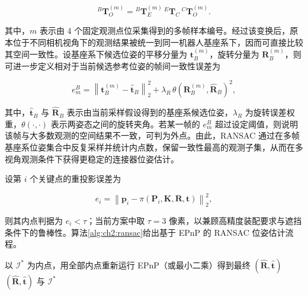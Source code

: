 $$
{}^{B}\mathbf{T}_{O}^{(m)} = {}^{B}\mathbf{T}_{E}^{(m)}\,{}^{E}\mathbf{T}_{C}\,{}^{C}\mathbf{T}_{O}^{(m)}.
$$

其中，\(m\) 表示由 4 个固定观测点位采集得到的多帧样本编号。经过该变换后，原本位于不同相机视角下的观测结果被统一到同一机器人基座系下，因而可直接比较其空间一致性。设基座系下候选位姿的平移分量为 \(\mathbf{t}_{B}^{(m)}\)，旋转分量为 \(\mathbf{R}_{B}^{(m)}\)，则可进一步定义相对于当前候选参考位姿的帧间一致性误差为

$$
e_m^{B}=\left\|\mathbf{t}_{B}^{(m)}-\hat{\mathbf{t}}_{B}\right\|_2^2+\lambda_{R}\,\theta\!\left(\mathbf{R}_{B}^{(m)},\hat{\mathbf{R}}_{B}\right)^2,
$$

其中，\(\hat{\mathbf{t}}_{B}\) 与 \(\hat{\mathbf{R}}_{B}\) 表示由当前采样假设得到的基座系候选位姿，\(\lambda_{R}\) 为旋转误差权重，\(\theta(\cdot,\cdot)\) 表示两姿态之间的旋转夹角。若某一帧的 \(e_m^{B}\) 超过设定阈值，则说明该帧与大多数观测的空间结果不一致，可判为外点。由此，RANSAC 通过在多帧基座系位姿集合中反复采样并统计内点数，保留一致性最高的观测子集，从而在多视角观测条件下获得更稳定的连接器位姿估计。

设第 \(i\) 个关键点的重投影误差为

$$
e_i=\left\|\mathbf{p}_i-\pi(\mathbf{P}_i,\mathbf{K},\mathbf{R},\mathbf{t})\right\|_2^2,
$$

则其内点判据为 \(e_i<\tau\)；当前方案中取 \(\tau=3\) 像素，以兼顾高精度装配要求与遮挡条件下的鲁棒性。算法\ref{alg:ch2:ransac}给出基于 EPnP 的 RANSAC 位姿估计流程。

\begin{algorithm}[htbp]
\caption{基于 EPnP 的 RANSAC 位姿估计}
\label{alg:ch2:ransac}
以 \(\mathcal{I}^*\) 为内点，用全部内点重新运行 EPnP（或最小二乘）得到最终 \((\hat{\mathbf{R}},\hat{\mathbf{t}})\)\;
\Return \((\hat{\mathbf{R}},\hat{\mathbf{t}})\) 与 \(\mathcal{I}^*\)
\end{algorithm}

